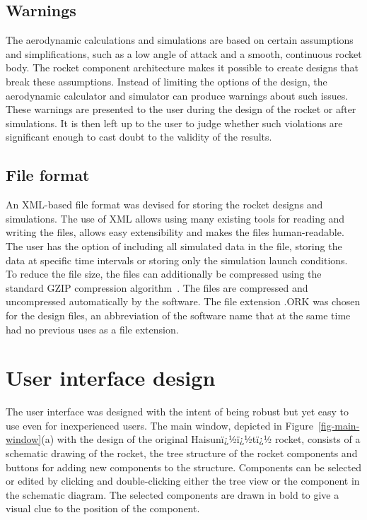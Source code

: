 \subsection{Warnings}
\label{sec-warnings}

The aerodynamic calculations and simulations are based on certain
assumptions and simplifications, such as a low angle of attack and a
smooth, continuous rocket body.  The rocket component architecture
makes it possible to create designs that break these assumptions.
Instead of limiting the options of the design, the aerodynamic
calculator and simulator can produce warnings about such issues.
These warnings are presented to the user during the design of the
rocket or after simulations.  It is then left up to the user to judge
whether such violations are significant enough to cast doubt to the
validity of the results.


\subsection{File format}

An XML-based file format was devised for storing the rocket designs
and simulations.  The use of XML allows using many existing tools for
reading and writing the files, allows easy extensibility and makes the
files human-readable.  The user has the option of including all
simulated data in the file, storing the data at specific time
intervals or storing only the simulation launch conditions.  To reduce
the file size, the files can additionally be compressed using the
standard GZIP compression algorithm~\cite{GZIP}.  The files are
compressed and uncompressed automatically by the software.  The file
extension .ORK was chosen for the design files, an abbreviation of the
software name that at the same time had no previous uses as a file
extension.





\section{User interface design}

The user interface was designed with the intent of being robust but
yet easy to use even for inexperienced users.  The main window,
depicted in Figure~\ref{fig-main-window}(a) with the design of the
original Haisunï¿½ï¿½tï¿½ rocket, consists of a schematic drawing of the
rocket, the tree structure of the rocket components and
buttons for adding new components to the structure. Components can
be selected or edited by clicking and double-clicking either the tree
view or the component in the schematic diagram.  The selected
components are drawn in bold to give a visual clue to the position
of the component.

